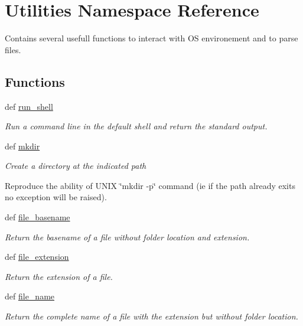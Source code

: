 \hypertarget{namespaceUtilities}{\section{Utilities Namespace Reference}
\label{namespaceUtilities}
}


Contains several usefull functions to interact with O\-S environement and to parse files.  


\subsection*{Functions}
\begin{DoxyCompactItemize}
\item 
def \hyperlink{namespaceUtilities_abe30502337ec442f49d75fd78adc7363}{run\-\_\-shell}
\begin{DoxyCompactList}\small\item\em Run a command line in the default shell and return the standard output. \end{DoxyCompactList}\item 
def \hyperlink{namespaceUtilities_a47e69754d361d402b51251f2a12fb3cd}{mkdir}
\begin{DoxyCompactList}\small\item\em Create a directory at the indicated path\par
 Reproduce the ability of U\-N\-I\-X \char`\"{}mkdir -\/p\char`\"{} command (ie if the path already exits no exception will be raised). \end{DoxyCompactList}\item 
def \hyperlink{namespaceUtilities_a368add4683bf899fca50bae0f8fd6945}{file\-\_\-basename}
\begin{DoxyCompactList}\small\item\em Return the basename of a file without folder location and extension. \end{DoxyCompactList}\item 
def \hyperlink{namespaceUtilities_a0f30d493c3ef8c9882b561e405ea180c}{file\-\_\-extension}
\begin{DoxyCompactList}\small\item\em Return the extension of a file. \end{DoxyCompactList}\item 
def \hyperlink{namespaceUtilities_a1ee03c6d8c2bb70216b5b62051bb125c}{file\-\_\-name}
\begin{DoxyCompactList}\small\item\em Return the complete name of a file with the extension but without folder location. \end{DoxyCompactList}\item 

\end{DoxyCompactItemize}
